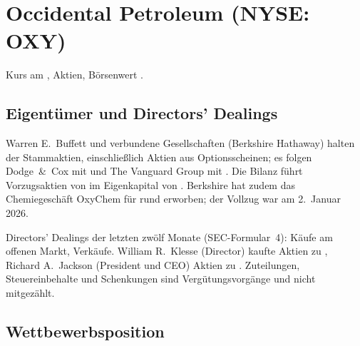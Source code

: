 \section{Occidental Petroleum (NYSE: OXY)}
\label{sec:oxy}

Kurs  am \OxyKursDatum{},
\Mio{\OxyAktienMio}{} Aktien, B\"orsenwert .

\subsection{Eigent\"umer und Directors' Dealings}

Warren E.~Buffett und verbundene Gesellschaften (Berkshire Hathaway) halten
\Pz{\OxyBerkshireAnteil} der Stammaktien, einschlie{\ss}lich
\Mio{\OxyBerkshireOptionsscheine}{} Aktien aus Optionsscheinen; es folgen
Dodge~\&~Cox mit \Pz{\OxyDodgeAnteil} und The Vanguard Group mit
\Pz{\OxyVanguardAnteil}. Die Bilanz f\"uhrt Vorzugsaktien von
 im Eigenkapital von .
Berkshire hat zudem das Chemiegesch\"aft OxyChem f\"ur rund 
erworben; der Vollzug war am 2.~Januar 2026.

Directors' Dealings der letzten zw\"olf Monate (SEC-Formular~4): \OxyDdKaeufe{} K\"aufe am
offenen Markt, \OxyDdVerkaeufe{} Verk\"aufe. William R.~Klesse (Director) kaufte
\OxyKlesseStueck{} Aktien zu , Richard A.~Jackson (President und
CEO) \OxyJacksonStueck{} Aktien zu . Zuteilungen, Steuereinbehalte und
Schenkungen sind Verg\"utungsvorg\"ange und nicht mitgez\"ahlt.


\subsection{Wettbewerbsposition}

